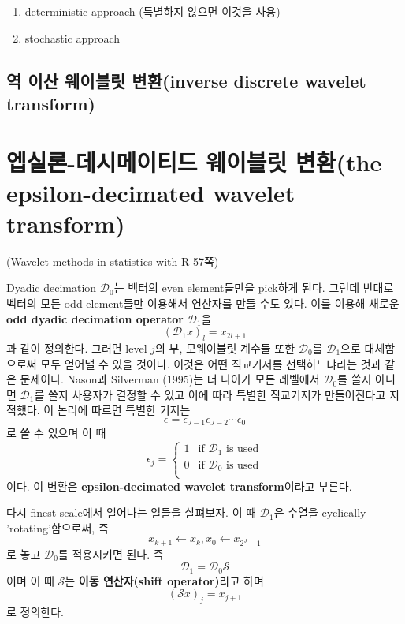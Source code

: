 \documentclass[b5paper,]{book}
\theoremstyle{definition}
\theoremstyle{definition}
\theoremstyle{definition}
\theoremstyle{remark}
\begin{document}
\begin{enumerate}
\def\labelenumi{\arabic{enumi}.}
\item
  deterministic approach (특별하지 않으면 이것을 사용)
\item
  stochastic approach
\end{enumerate}

\subsection{역 이산 웨이블릿 변환(inverse discrete wavelet
transform)}\label{---inverse-discrete-wavelet-transform}

\section{엡실론-데시메이티드 웨이블릿 변환(the epsilon-decimated wavelet
transform)}\label{---the-epsilon-decimated-wavelet-transform}

(Wavelet methods in statistics with R 57쪽)

Dyadic decimation \(\mathcal{D}_{0}\)는 벡터의 even element들만을
pick하게 된다. 그런데 반대로 벡터의 모든 odd element들만 이용해서
연산자를 만들 수도 있다. 이를 이용해 새로운 \textbf{odd dyadic
decimation operator} \(\mathcal{D}_{1}\)을
\[(\mathcal{D}_{1}x)_{l}=x_{2l+1}\] 과 같이 정의한다. 그러면 level
\(j\)의 부, 모웨이블릿 계수들 또한 \(\mathcal{D}_{0}\)를
\(\mathcal{D}_{1}\)으로 대체함으로써 모두 얻어낼 수 있을 것이다. 이것은
어떤 직교기저를 선택하느냐라는 것과 같은 문제이다. Nason과 Silverman
(1995)는 더 나아가 모든 레벨에서 \(\mathcal{D}_{0}\)를 쓸지 아니면
\(\mathcal{D}_{1}\)를 쓸지 사용자가 결정할 수 있고 이에 따라 특별한
직교기저가 만들어진다고 지적했다. 이 논리에 따르면 특별한 기저는
\[\epsilon=\epsilon_{J-1}\epsilon_{J-2}\cdots\epsilon_{0}\] 로 쓸 수
있으며 이 때 \[
\epsilon_{j} = 
\begin{cases}
1 & \text{if $\mathcal{D}_{1}$ is used} \\
0 & \text{if $\mathcal{D}_{0}$ is used}\\
\end{cases}
\] 이다. 이 변환은 \textbf{epsilon-decimated wavelet transform}이라고
부른다.

다시 finest scale에서 일어나는 일들을 살펴보자. 이 때
\(\mathcal{D}_{1}\)은 수열을 cyclically 'rotating'함으로써, 즉
\[x_{k+1} \leftarrow x_{k}, x_{0} \leftarrow x_{2^{J}-1}\] 로 놓고
\(\mathcal{D}_{0}\)를 적용시키면 된다. 즉
\[\mathcal{D}_{1}=\mathcal{D}_{0}\mathcal{S}\] 이며 이 때
\(\mathcal{S}\)는 \textbf{이동 연산자(shift operator)}라고 하며
\[(\mathcal{S}x)_{j}=x_{j+1}\] 로 정의한다.
\end{document}
